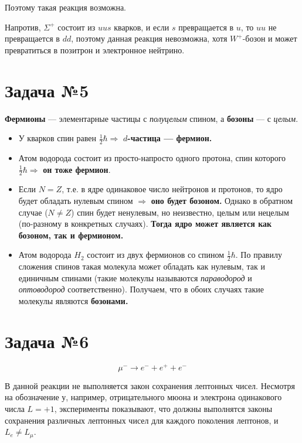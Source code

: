 \documentclass[12pt]{article}
\newcommand{\te}{\ensuremath{\Rightarrow}}
\newcommand{\st}{\ensuremath{\longrightarrow}}
\begin{document}
Поэтому такая реакция возможна.

Напротив, $ \Sigma^+ $ состоит из $ uus $ кварков, и если $ s $ превращается в $ u $, то $ uu $ не превращается в $ dd $, поэтому данная реакция невозможна, хотя $ W^+ $-бозон и может превратиться в позитрон и электронное нейтрино.

\section{Задача №5}

\textbf{Фермионы} --- элементарные частицы с \textit{полуцелым} спином, а\textbf{ бозоны} --- с \textit{целым}.

\begin{itemize}
	
	\item У кварков спин равен $ \frac12\hbar \te $  \textbf{$ d $-частица --- фермион.}
	
	\item Атом водорода состоит из просто-напросто одного протона, спин которого  $ \frac12\hbar \te $ \textbf{он тоже фермион}.
	
	\item Если $ N = Z $, т.е. в ядре одинаковое число нейтронов и протонов, то ядро будет обладать нулевым спином $ \te $ \textbf{оно будет бозоном.} Однако в обратном случае ($ N\neq Z$) спин будет ненулевым, но неизвестно, целым или нецелым (по-разному в конкретных случаях). \textbf{Тогда ядро может является как бозоном, так и фермионом.}
	
	\item Атом водорода $ H_2 $ состоит из двух фермионов со спином  $ \frac12\hbar  $. По правилу сложения спинов такая молекула может обладать как нулевым, так и единичным спинами (такие молекулы называются \textit{параводород} и \textit{оптоводород} соответственно). Получаем, что в обоих случаях такие молекулы являются \textbf{бозонами.}
		
\end{itemize}

\section{Задача №6}

\begin{equation}
\mu^- \st e^- + e^+ + e^-
\end{equation}

 В данной реакции не выполняется закон сохранения лептонных чисел. Несмотря на обозначение у, например, отрицательного мюона и электрона одинакового числа $L =  +1 $, эксперименты показывают, что должны выполнятся законы сохранения различных лептонных чисел для каждого поколения лептонов, и $ L_e \neq L_\mu $. 
 
\end{document}
